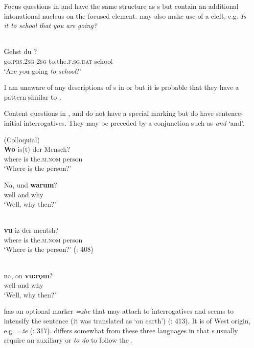 Focus questions in  and  have the same structure as s but contain an additional intonational nucleus on the focused element.  may also make use of a cleft, e.g. \textit{Is it to school} \textit{that you are going?}

\ea%
    \label{ex:indo:6}
    \\
    \gll Gehst    du   ?\\
    go\textsc{.prs.}2\textsc{sg}  2\textsc{sg}  to.the.\textsc{f.sg.dat}  school\\
    \glt ‘Are you going \textit{to school}?’
    \z

\noindent I am unaware of any descriptions of s in  or  but it is probable that they have a pattern similar to .

Content questions in ,  and  do not have a special marking but do have sentence-initial interrogatives. They may be preceded by a conjunction such as  \textit{und} ‘and’.

\ea%
    \label{ex:indo:7}
     (Colloquial)\\
    \ea
    \gll \textbf{{Wo}} is(t)  der    Mensch?\\
    where  is  the.\textsc{m.nom}  person\\
    \glt ‘Where is the person?’
    
    \ex
    \gll Na,  und \textbf{{warum}}?\\
    well  and  why\\
    \glt ‘Well, why then?’
    \z
    \z

\ea%
    \label{ex:indo:8}
    \\
    \gll \textbf{{vu}} iz  der    mentsh?\\
    where  is  the.\textsc{m.nom}  person\\
    \glt ‘Where is the person?’ (\citealt{JacobsPrincevanderAuwera1994}: 408)
    \z

\ea%
    \label{ex:indo:9}
    \\
    \gll na,  on \textbf{{vu:rǫm}}?\\
    well  and  why\\
    \glt ‘Well, why then?’ \citep[170]{Jedig2014}
    \z

 has an optional marker \textit{=zhe} that may attach to interrogatives and seems to intensify the sentence (it was translated as ‘on earth’) (\citealt{JacobsPrincevanderAuwera1994}: 413). It is of West  origin, e.g.  \textit{=že} (\citealt{SussexCubberley2006}: 317).  differs somewhat from these three languages in that s usually require an auxiliary or \textit{to do} to follow the .

